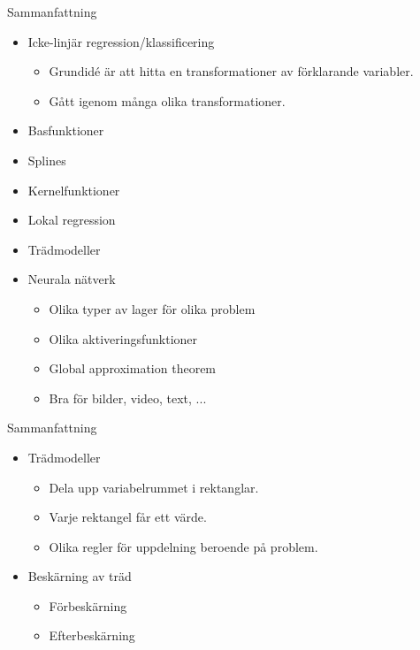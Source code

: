 \documentclass[10pt,english]{beamer}
\begin{document}
\begin{frame}{Sammanfattning}
    
    \begin{itemize}
        \item Icke-linjär regression/klassificering
        \begin{itemize}
            \item Grundidé är att hitta en transformationer av förklarande variabler.
            \item Gått igenom många olika transformationer.
        \end{itemize}
        \item Basfunktioner
        \item Splines
        \item Kernelfunktioner
        \item Lokal regression
        \item Trädmodeller
        \item Neurala nätverk
        \begin{itemize}
            \item Olika typer av lager för olika problem
            \item Olika aktiveringsfunktioner
            \item Global approximation theorem
            \item Bra för bilder, video, text, ...
        \end{itemize}
    \end{itemize}

\end{frame}

\begin{frame}{Sammanfattning}
    \begin{itemize}
        \item Trädmodeller
        \begin{itemize}
            \item Dela upp variabelrummet i rektanglar.
            \item Varje rektangel får ett värde.
            \item Olika regler för uppdelning beroende på problem.
        \end{itemize}
        \item Beskärning av träd
        \begin{itemize}
            \item Förbeskärning
            \item Efterbeskärning
        \end{itemize}
    \end{itemize}
\end{frame}
\end{document}
